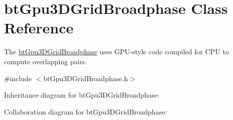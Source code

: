 \hypertarget{classbt_gpu3_d_grid_broadphase}{\section{bt\+Gpu3\+D\+Grid\+Broadphase Class Reference}
\label{classbt_gpu3_d_grid_broadphase}
}


The \hyperlink{classbt_gpu3_d_grid_broadphase}{bt\+Gpu3\+D\+Grid\+Broadphase} uses G\+P\+U-\/style code compiled for C\+P\+U to compute overlapping pairs.  




{\ttfamily \#include $<$bt\+Gpu3\+D\+Grid\+Broadphase.\+h$>$}



Inheritance diagram for bt\+Gpu3\+D\+Grid\+Broadphase\+:


Collaboration diagram for bt\+Gpu3\+D\+Grid\+Broadphase\+:
